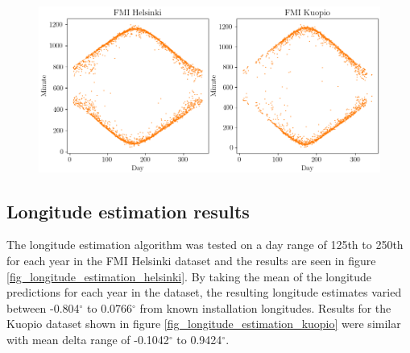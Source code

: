


\begin{figure}[ht!]
\centering
\includegraphics[width=0.9\linewidth]{pics/first_last_helsinki_kuopio2}
\label{fig_first_last_kuopio_helsinki}
\end{figure}

\clearpage

\subsection{Longitude estimation results}
The longitude estimation algorithm was tested on a day range of 125th to 250th for each year in the FMI Helsinki dataset and the results are seen in figure \ref{fig_longitude_estimation_helsinki}. By taking the mean of the longitude predictions for each year in the dataset, the resulting longitude estimates varied between -0.804$^\circ$ to 0.0766$^\circ$ from known installation longitudes. Results for the Kuopio dataset shown in figure \ref{fig_longitude_estimation_kuopio} were similar with mean delta range of -0.1042$^\circ$ to 0.9424$^\circ$.


